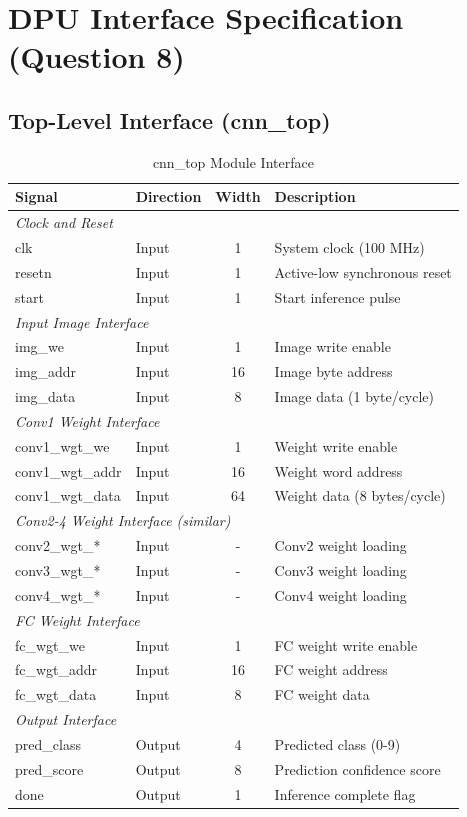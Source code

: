 \documentclass[11pt,a4paper]{article}
\begin{document}
\section{DPU Interface Specification (Question 8)}

\subsection{Top-Level Interface (cnn\_top)}

\begin{table}[H]
\centering
\caption{cnn\_top Module Interface}
\begin{tabular}{llcp{6cm}}
\toprule
\textbf{Signal} & \textbf{Direction} & \textbf{Width} & \textbf{Description} \\
\midrule
\multicolumn{4}{l}{\textit{Clock and Reset}} \\
clk & Input & 1 & System clock (100 MHz) \\
resetn & Input & 1 & Active-low synchronous reset \\
start & Input & 1 & Start inference pulse \\
\midrule
\multicolumn{4}{l}{\textit{Input Image Interface}} \\
img\_we & Input & 1 & Image write enable \\
img\_addr & Input & 16 & Image byte address \\
img\_data & Input & 8 & Image data (1 byte/cycle) \\
\midrule
\multicolumn{4}{l}{\textit{Conv1 Weight Interface}} \\
conv1\_wgt\_we & Input & 1 & Weight write enable \\
conv1\_wgt\_addr & Input & 16 & Weight word address \\
conv1\_wgt\_data & Input & 64 & Weight data (8 bytes/cycle) \\
\midrule
\multicolumn{4}{l}{\textit{Conv2-4 Weight Interface (similar)}} \\
conv2\_wgt\_* & Input & - & Conv2 weight loading \\
conv3\_wgt\_* & Input & - & Conv3 weight loading \\
conv4\_wgt\_* & Input & - & Conv4 weight loading \\
\midrule
\multicolumn{4}{l}{\textit{FC Weight Interface}} \\
fc\_wgt\_we & Input & 1 & FC weight write enable \\
fc\_wgt\_addr & Input & 16 & FC weight address \\
fc\_wgt\_data & Input & 8 & FC weight data \\
\midrule
\multicolumn{4}{l}{\textit{Output Interface}} \\
pred\_class & Output & 4 & Predicted class (0-9) \\
pred\_score & Output & 8 & Prediction confidence score \\
done & Output & 1 & Inference complete flag \\
\bottomrule
\end{tabular}
\end{table}
\end{document}
